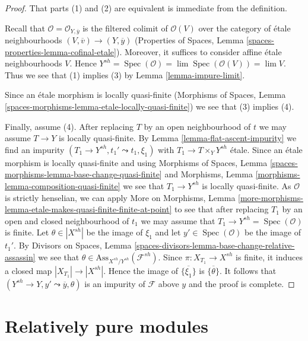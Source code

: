 \documentclass{stacks-project}
\theoremstyle{plain}
\theoremstyle{definition}
\theoremstyle{remark}
\numberwithin{equation}{subsection}
\def\lim{\mathop{\mathrm{lim}}\nolimits}
\def\Spec{\mathop{\mathrm{Spec}}}
\begin{document}
\begin{proof}
That parts (1) and (2) are equivalent is immediate from the definition.

\medskip\noindent
Recall that $\mathcal{O} = \mathcal{O}_{Y, \overline{y}}$
is the filtered colimit of $\mathcal{O}(V)$ over the category
of \'etale neighbourhoods $(V, \overline{v}) \to (Y, \overline{y})$
(Properties of Spaces, Lemma \ref{spaces-properties-lemma-cofinal-etale}).
Moreover, it suffices to consider affine \'etale neighbourhoods $V$.
Hence $Y^{sh} = \Spec(\mathcal{O}) = \lim \Spec(\mathcal{O}(V)) = \lim V$.
Thus we see that (1) implies (3) by Lemma \ref{lemma-impure-limit}.

\medskip\noindent
Since an \'etale morphism is locally quasi-finite
(Morphisms of Spaces, Lemma
\ref{spaces-morphisms-lemma-etale-locally-quasi-finite})
we see that (3) implies (4).

\medskip\noindent
Finally, assume (4). After replacing $T$ by an open neighbourhood of $t$
we may assume $T \to Y$ is locally quasi-finite.
By Lemma \ref{lemma-flat-ascent-impurity}
we find an impurity
$(T_1 \to Y^{sh}, t_1' \leadsto t_1, \xi_1)$
with $T_1 \to T \times_Y Y^{sh}$
\'etale. Since an \'etale morphism is locally quasi-finite
and using Morphisms of Spaces, Lemma
\ref{spaces-morphisms-lemma-base-change-quasi-finite} and
Morphisms, Lemma \ref{morphisms-lemma-composition-quasi-finite}
we see that $T_1 \to Y^{sh}$ is locally quasi-finite.
As $\mathcal{O}$ is strictly henselian, we can apply More on Morphisms, Lemma
\ref{more-morphisms-lemma-etale-makes-quasi-finite-finite-at-point}
to see that after replacing $T_1$ by an open and closed neighbourhood
of $t_1$ we may assume that $T_1 \to Y^{sh} = \Spec(\mathcal{O})$
is finite. Let $\theta \in |X^{sh}|$ be the image of
$\xi_1$ and let $y' \in \Spec(\mathcal{O})$ be the image
of $t_1'$. By Divisors on Spaces, Lemma
\ref{spaces-divisors-lemma-base-change-relative-assassin}
we see that $\theta \in \text{Ass}_{X^{sh}/Y^{sh}}(\mathcal{F}^{sh})$.
Since $\pi : X_{T_1} \to X^{sh}$
is finite, it induces a closed map $|X_{T_1}| \to |X^{sh}|$.
Hence the image of $\overline{\{\xi_1\}}$ is $\overline{\{\theta\}}$.
It follows that $(Y^{sh} \to Y, y' \leadsto \overline{y}, \theta)$
is an impurity of $\mathcal{F}$ above $y$ and the proof is complete.
\end{proof}








\section{Relatively pure modules}
\label{section-pure}
\end{document}
